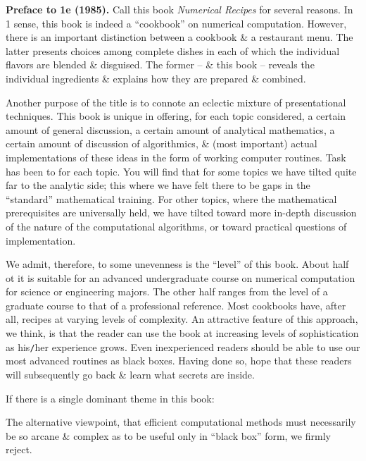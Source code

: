 \documentclass{article}
\begin{document}
\begin{enumerate}
	{\bf Preface to 1e (1985).} Call this book {\it Numerical Recipes} for several reasons. In 1 sense, this book is indeed a ``cookbook'' on numerical computation. However, there is an important distinction between a cookbook \& a restaurant menu. The latter presents choices among complete dishes in each of which the individual flavors are blended \& disguised. The former -- \& this book -- reveals the individual ingredients \& explains how they are prepared \& combined.
	
	Another purpose of the title is to connote an eclectic mixture of presentational techniques. This book is unique in offering, for each topic considered, a certain amount of general discussion, a certain amount of analytical mathematics, a certain amount of discussion of algorithmics, \& (most important) actual implementations of these ideas in the form of working computer routines. Task has been to  for each topic. You will find that for some topics we have tilted quite far to the analytic side; this where we have felt there to be gaps in the ``standard'' mathematical training. For other topics, where
	the mathematical prerequisites are universally held, we have tilted toward more in-depth discussion of the nature of the computational algorithms, or toward practical questions of implementation.
	
	We admit, therefore, to some unevenness is the ``level'' of this book. About half ot it is suitable for an advanced undergraduate course on numerical computation for science or engineering majors. The other half ranges from the level of a graduate course to that of a professional reference. Most cookbooks have, after all, recipes at varying levels of complexity. An attractive feature of this approach, we think, is that the reader can use the book at increasing levels of sophistication as his{\tt/}her experience grows. Even inexperienced readers should be able to use our most advanced routines as black boxes. Having done so, hope that these readers will subsequently go back \& learn what secrets are inside.
	
	If there is a single dominant theme in this book:
	\begin{center}
	\end{center}
	The alternative viewpoint, that efficient computational methods must necessarily be so arcane \& complex as to be useful only in ``black box'' form, we firmly reject.
	

\end{enumerate}
\end{document}
